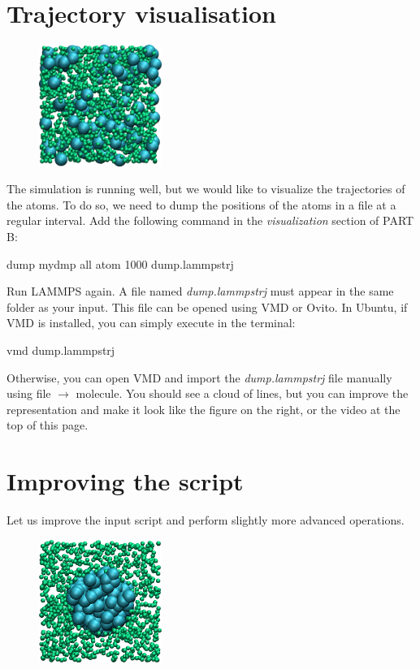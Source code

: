\noindent \section{Trajectory visualisation}

\hspace{-0.45cm}\begin{figure}
\includegraphics[width=4cm]{tutorials/level0/lennard-jones-fluid/input1.png}
\end{figure}

\noindent The simulation is running well, but we would like to
visualize the trajectories of the atoms. To do so, we need
to dump the positions of the atoms in a file at a regular
interval. Add the following command in the \textit{visualization}
section of PART B:

\begin{lcverbatim}
dump mydmp all atom 1000 dump.lammpstrj
\end{lcverbatim}

\noindent Run LAMMPS again. A file named \textit{dump.lammpstrj} must appear in
the same folder as your input. This file can be opened using
VMD or Ovito. In Ubuntu, if VMD is installed, you can simply
execute in the terminal:

\begin{lcverbatim}
vmd dump.lammpstrj
\end{lcverbatim}

\noindent Otherwise, you can open VMD and import the \textit{dump.lammpstrj}
file manually using file $\rightarrow$ molecule. You should see a cloud
of lines, but you can improve the representation and make it
look like the figure on the right, or the video at the 
top of this page. 

\section{Improving the script}

\noindent Let us improve the input script and perform slightly more
advanced operations.

\hspace{-0.45cm}\begin{figure}
\includegraphics[width=4cm]{tutorials/level0/lennard-jones-fluid/input2.png}
\end{figure}

